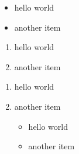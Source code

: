 \begin{itemize}
    \item hello world
    \item another item
\end{itemize}

\begin{enumerate}
    \item hello world
    \item another item
\end{enumerate}

\begin{enumerate}
    \item hello world
    \item another item
    \begin{itemize}
        \item hello world
        \item another item
    \end{itemize}
\end{enumerate}